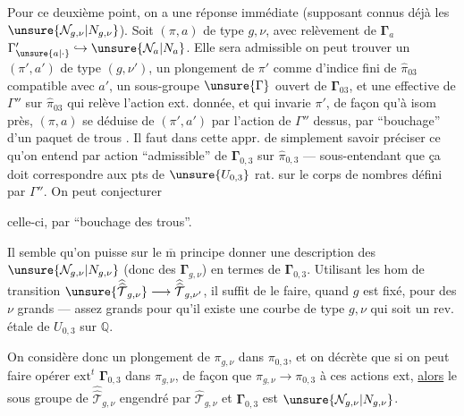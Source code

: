 Pour ce deuxième point, on a une réponse immédiate (supposant connus déjà les
$\unsure{\mathcal{N}_{g,\nu}|N_{g,\nu}}$). Soit  $(\pi,a)$ de type $g,\nu$,
avec  relèvement  de $\boldsymbol{\Gamma}_a$ 
$\Gamma'_{\unsure{a|\cdot}}\hookrightarrow \unsure{\mathcal{N}_a|N_a}$.
Elle sera admissible  on peut trouver
un $(\pi',a')$ de type $(g,\nu')$,  un
plongement de $\pi'$ comme  d'indice fini de $\widehat{\pi}_{03}$ compatible avec $a'$,
 un sous-groupe $\unsure{\Gamma}$ ouvert  de $\boldsymbol{\Gamma}_{03}$, et
une  effective  de $\Gamma''$ 
sur $\widehat{\pi}_{03}$ qui
relève l'action ext. donnée, et qui
invarie $\pi'$, de façon qu'à isom
près, $(\pi,a)$ 
se déduise de $(\pi',a')$
par l'action de $\Gamma''$ dessus, par ``bouchage''
d'un paquet de trous . Il faut
dans cette appr. de simplement savoir
préciser  ce qu'on entend par
action ``admissible'' de  $\boldsymbol{\Gamma}_{0,3}$ sur $\widehat{\pi}_{0,3}$
--- sous-entendant que ça doit correspondre
aux pts de $\unsure{U_{0,3}}$ rat. sur  le corps
de nombres défini par $\Gamma''$. On peut conjecturer


celle-ci, par ``bouchage des trous''.

Il semble qu'on puisse sur le $\overline{\mathrm m}$
principe donner une description des
$\unsure{\mathcal{N}_{g,\nu}|N_{g,\nu}}$ (donc des $\boldsymbol{\Gamma}_{g,\nu}$)
en termes de
$\boldsymbol{\Gamma}_{0,3}$. Utilisant les hom de transition
$\unsure{\widehat{\widehat{\mathcal{T}}}_{g,\nu}}
\longrightarrow
\widehat{\widehat{\mathcal{T}}}_{g,\nu'}$,
il suffit de le
faire, quand $g$ est fixé, pour des $\nu$
grands --- assez grands pour qu'il
existe une courbe  de type $g,\nu$ 
qui soit un rev. étale de $U_{0,3}$ sur $\mathbb{Q}$.

On considère donc un plongement 
de $\pi_{g,\nu}$ dans $\pi_{0,3}$, et on
décrète que si  on peut faire
opérer $\mathrm{ext}^{t}$ $\boldsymbol{\Gamma}_{0,3}$ dans $\pi_{g,\nu}$, de
façon que $\pi_{g,\nu}\longrightarrow\pi_{0,3}$ 
à ces actions ext, \uline{alors} le sous
groupe de $\widehat{\widehat{\mathcal{T}}}_{g,\nu}$ engendré par
$\widehat{\mathcal{T}}_{g,\nu}$ et
$\boldsymbol{\Gamma}_{0,3}$ est 
$\unsure{\mathcal{N}_{g,\nu}|N_{g,\nu}}$.

